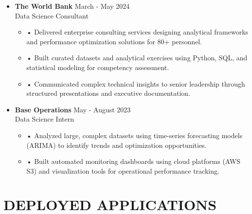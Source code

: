 \documentclass[a4paper,9pt]{extarticle}
\begin{document}
\noindent
\begin{itemize}[leftmargin=0.4cm, label={}]
    \item \textbf{The World Bank} \hfill March - May 2024 \\
    Data Science Consultant
    \vspace{-0.1cm}
    \begin{itemize}[leftmargin=0.3cm, label={}]
    \item \small{•} \normalsize{Delivered enterprise consulting services designing analytical frameworks and performance optimization solutions for 80+ personnel.}
    \item \small{•} \normalsize{Built curated datasets and analytical exercises using Python, SQL, and statistical modeling for competency assessment.}
    \item \small{•} \normalsize{Communicated complex technical insights to senior leadership through structured presentations and executive documentation.}
    \end{itemize}
\end{itemize}

\noindent
\begin{itemize}[leftmargin=0.4cm, label={}]
    \item \textbf{Base Operations} \hfill May - August 2023 \\
    Data Science Intern
    \vspace{-0.1cm}
    \begin{itemize}[leftmargin=0.3cm, label={}]
    \item \small{•} \normalsize{Analyzed large, complex datasets using time-series forecasting models (ARIMA) to identify trends and optimization opportunities.}
    \item \small{•} \normalsize{Built automated monitoring dashboards using cloud platforms (AWS S3) and visualization tools for operational performance tracking.}
    \end{itemize}
\end{itemize}

\section*{DEPLOYED APPLICATIONS}
\end{document}
